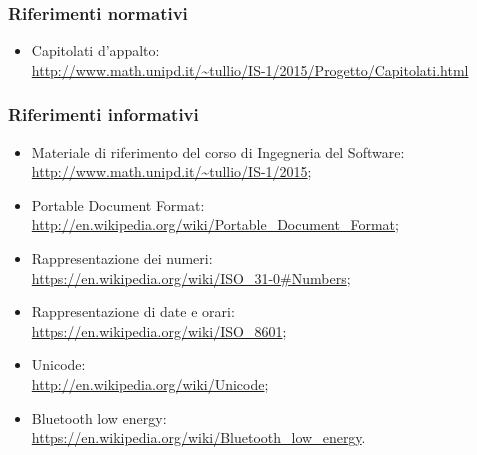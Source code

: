 \documentclass[../NormeProgetto.tex]{subfiles}
\begin{document}
		\subsubsection{Riferimenti normativi}
		\begin{itemize}
			\item Capitolati d'appalto: \\\url{http://www.math.unipd.it/~tullio/IS-1/2015/Progetto/Capitolati.html}
		\end{itemize}
		\subsubsection{Riferimenti informativi}
		\begin{itemize}
			\item Materiale di riferimento del corso di Ingegneria del Software: \\\url{http://www.math.unipd.it/~tullio/IS-1/2015};
			\item Portable Document Format:  \\\url{http://en.wikipedia.org/wiki/Portable_Document_Format};
			\item Rappresentazione dei numeri: \\\url{https://en.wikipedia.org/wiki/ISO_31-0#Numbers};
			\item Rappresentazione di date e orari: \\\url{https://en.wikipedia.org/wiki/ISO_8601};
			\item Unicode: \\\url{http://en.wikipedia.org/wiki/Unicode};
			\item Bluetooth low energy: \\\url{https://en.wikipedia.org/wiki/Bluetooth_low_energy}.
		\end{itemize}
\end{document}
